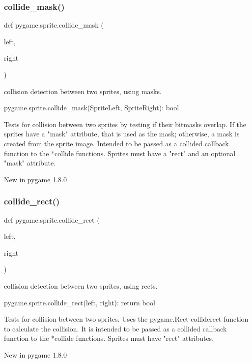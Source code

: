 \subsubsection{\texorpdfstring{collide\+\_\+mask()}{collide\_mask()}}
{\footnotesize\ttfamily def pygame.\+sprite.\+collide\+\_\+mask (\begin{DoxyParamCaption}\item[{}]{left,  }\item[{}]{right }\end{DoxyParamCaption})}

\begin{DoxyVerb}collision detection between two sprites, using masks.

pygame.sprite.collide_mask(SpriteLeft, SpriteRight): bool

Tests for collision between two sprites by testing if their bitmasks
overlap. If the sprites have a "mask" attribute, that is used as the mask;
otherwise, a mask is created from the sprite image. Intended to be passed
as a collided callback function to the *collide functions. Sprites must
have a "rect" and an optional "mask" attribute.

New in pygame 1.8.0\end{DoxyVerb}
 \mbox{\label{namespacepygame_1_1sprite_a38539bf4d7efe1157a864e4ecb9b5237}} 
\subsubsection{\texorpdfstring{collide\+\_\+rect()}{collide\_rect()}}
{\footnotesize\ttfamily def pygame.\+sprite.\+collide\+\_\+rect (\begin{DoxyParamCaption}\item[{}]{left,  }\item[{}]{right }\end{DoxyParamCaption})}

\begin{DoxyVerb}collision detection between two sprites, using rects.

pygame.sprite.collide_rect(left, right): return bool

Tests for collision between two sprites. Uses the pygame.Rect colliderect
function to calculate the collision. It is intended to be passed as a
collided callback function to the *collide functions. Sprites must have
"rect" attributes.

New in pygame 1.8.0\end{DoxyVerb}
 \mbox{\label{namespacepygame_1_1sprite_a60842ea8d65ad8db56c52b1f6f90de29}} 
